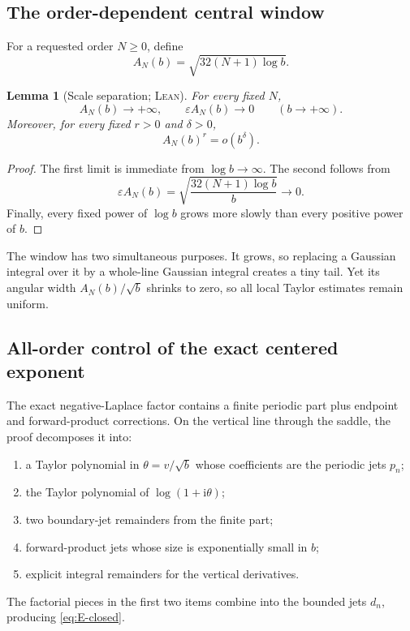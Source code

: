 \documentclass[11pt,oneside]{article}
\newtheorem{lemma}[theorem]{Lemma}
\theoremstyle{definition}
\theoremstyle{remark}
\newcommand{\ii}{\mathrm i}
\newcommand{\Formalized}{\textsc{Lean}}
\begin{document}
\subsection{The order-dependent central window}

For a requested order $N\geq0$, define
\begin{equation}
 A_N(b)=\sqrt{32(N+1)\log b}. \label{eq:central-radius}
\end{equation}

\begin{lemma}[Scale separation; \Formalized]
\label{lem:central-scale}
For every fixed $N$,
\[
 A_N(b)\longrightarrow+\infty,\qquad
 \varepsilon A_N(b)\longrightarrow0
 \qquad(b\to+\infty).
\]
Moreover, for every fixed $r>0$ and $\delta>0$,
\[
 A_N(b)^r=o(b^\delta).
\]
\end{lemma}

\begin{proof}
The first limit is immediate from $\log b\to\infty$.  The second follows
from
\[
 \varepsilon A_N(b)
 =\sqrt{\frac{32(N+1)\log b}{b}}\longrightarrow0.
\]
Finally, every fixed power of $\log b$ grows more slowly than every
positive power of $b$.
\end{proof}

The window has two simultaneous purposes.  It grows, so replacing a
Gaussian integral over it by a whole-line Gaussian integral creates a
tiny tail.  Yet its angular width
$A_N(b)/\sqrt b$ shrinks to zero, so all local Taylor estimates remain
uniform.

\subsection{All-order control of the exact centered exponent}

The exact negative-Laplace factor contains a finite periodic part plus
endpoint and forward-product corrections.  On the vertical line through
the saddle, the proof decomposes it into:
\begin{enumerate}
\item a Taylor polynomial in $\theta=v/\sqrt b$ whose coefficients are
the periodic jets $p_n$;
\item the Taylor polynomial of $\log(1+\ii\theta)$;
\item two boundary-jet remainders from the finite part;
\item forward-product jets whose size is exponentially small in $b$;
\item explicit integral remainders for the vertical derivatives.
\end{enumerate}
The factorial pieces in the first two items combine into the bounded
jets $d_n$, producing \eqref{eq:E-closed}.
\end{document}
